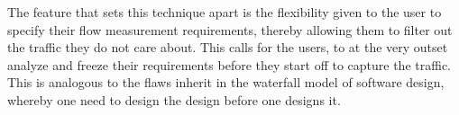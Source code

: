 The feature that sets this technique apart is the flexibility given to the user to specify their flow measurement requirements, thereby allowing them to filter out the traffic they do not care about. This calls for the users, to at the very outset analyze  and freeze their requirements before they start off to capture the traffic. This is analogous to the flaws inherit in the waterfall model \cite{wroyce:1987} of software design, whereby one need to design the design before one designs it.